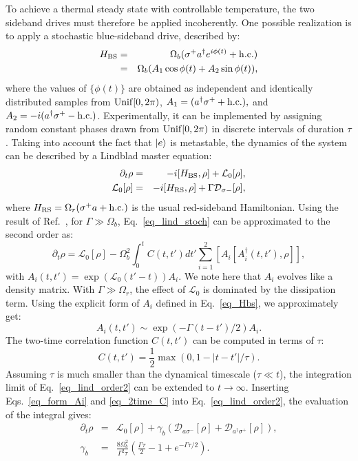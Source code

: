 \documentclass[
reprint,
superscriptaddress,

amsmath,amssymb,
aps,
prl,

floatfix,
]{revtex4-2}
\begin{document}
To achieve a thermal steady state with controllable temperature, the two sideband drives must therefore be applied incoherently. One possible realization is to apply a stochastic blue-sideband drive, described by:
\begin{eqnarray}
    H_{\rm BS}&=&  \Omega_b(\sigma^+a^\dagger e^{i\phi(t)}+\rm h.c.)\nonumber\\
    &=& \Omega_b(A_1\cos\phi(t)+A_2\sin\phi (t)),
    \label{eq_Hbs}
\end{eqnarray}
where  the values of $\{\phi(t)\}$ are obtained as independent and identically distributed samples from  ${\rm Unif}[0,2\pi)$, $A_1= (a^\dagger \sigma^+ + {\rm h.c.}),$ and $A_2=-i(a^\dagger \sigma^+-\rm h.c.)$. Experimentally, it can be implemented by assigning random constant phases drawn from ${\rm Unif}[0,2\pi)$ in discrete intervals of duration $\tau$. Taking into account the fact that $\ket{e}$ is metastable, the dynamics of the system can be described by a Lindblad master equation:
\begin{eqnarray}
        \partial_t\rho&=&-i[H_{\rm BS},\rho]+ \mathcal{L}_0[\rho],\nonumber\\
        \mathcal{L}_0[\rho]&=&-i[H_{\rm RS},\rho]+\Gamma\mathcal{D}_{\sigma-}[\rho],
        \label{eq_lind_stoch}
\end{eqnarray}
where $H_{\rm RS}=\Omega_{r}(\sigma^+a+{\rm h.c.})$
is the usual red-sideband Hamiltonian.
Using the result of Ref.~\cite{chenu2017noise}, for $\Gamma\gg\Omega_b$, Eq.~\eqref{eq_lind_stoch} can be approximated to the second order as:
\begin{equation}
    \partial_t \rho = \mathcal{L}_0[\rho] - \Omega_b^2\int_0^tC(t,t') dt' \sum_{i=1}^2{\left[A_i\left[A_i^\dagger(t,t'),\rho\right]\right]},
    \label{eq_lind_order2}
\end{equation}
with $A_i(t,t')=\exp(\mathcal{L}_0(t'-t))A_i$. We note here that $A_i$ evolves like a density matrix. With $\Gamma\gg\Omega_r$, the effect of $\mathcal{L}_0$ is dominated by the dissipation term. Using the explicit form of $A_i$ defined in Eq.~\eqref{eq_Hbs}, we approximately get:
\begin{equation}
    A_i(t,t')\sim \exp(-\Gamma(t-t')/2)A_i.
    \label{eq_form_Ai}
\end{equation}
The two-time correlation function  $C(t,t')$ can be computed in terms of $\tau$:
\begin{equation}
    C(t,t')=\frac{1}{2}\max(0,1-|t-t'|/\tau).
    \label{eq_2time_C}
\end{equation}
Assuming $\tau$ is much smaller than the dynamical timescale ($\tau\ll t$), the integration limit of Eq.~\eqref{eq_lind_order2} can be extended to $t\rightarrow\infty$. Inserting Eqs.~\eqref{eq_form_Ai} and \eqref{eq_2time_C} into Eq.~\eqref{eq_lind_order2}, the evaluation of the integral gives:
\begin{eqnarray}
     \partial_t\rho&=& \mathcal{L}_0[\rho]+\gamma_b\left(\mathcal{D}_{a\sigma^-}\left[\rho\right]+\mathcal{D}_{a^\dagger\sigma^+}\left[\rho\right]\right),\nonumber\\
     \gamma_b&=& \frac{8\Omega_b^2}{\Gamma^2\tau}\left(\frac{\Gamma\tau}{2}-1+e^{-\Gamma\tau/2}\right).
        \label{eq_lind_hc_full}
\end{eqnarray}
\end{document}
